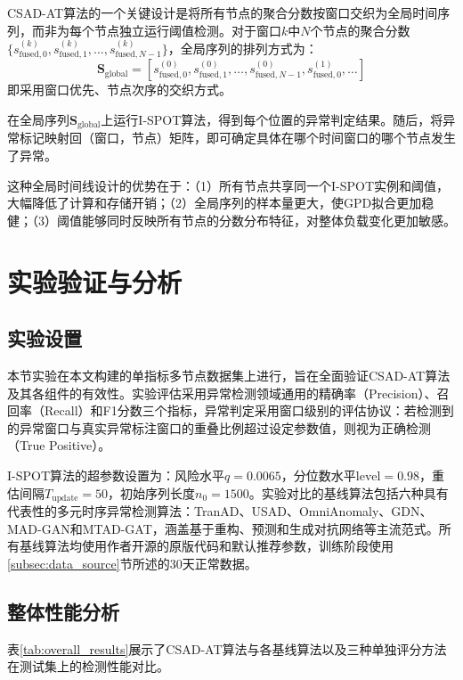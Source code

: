 CSAD-AT算法的一个关键设计是将所有节点的聚合分数按窗口交织为全局时间序列，而非为每个节点独立运行阈值检测。对于窗口$k$中$N$个节点的聚合分数$\{s_{\text{fused},0}^{(k)}, s_{\text{fused},1}^{(k)}, \ldots, s_{\text{fused},N-1}^{(k)}\}$，全局序列的排列方式为：
\begin{equation}
    \mathbf{S}_{\text{global}} = [s_{\text{fused},0}^{(0)}, s_{\text{fused},1}^{(0)}, \ldots, s_{\text{fused},N-1}^{(0)}, s_{\text{fused},0}^{(1)}, \ldots]
\end{equation}
即采用窗口优先、节点次序的交织方式。

在全局序列$\mathbf{S}_{\text{global}}$上运行I-SPOT算法，得到每个位置的异常判定结果。随后，将异常标记映射回（窗口，节点）矩阵，即可确定具体在哪个时间窗口的哪个节点发生了异常。

这种全局时间线设计的优势在于：（1）所有节点共享同一个I-SPOT实例和阈值，大幅降低了计算和存储开销；（2）全局序列的样本量更大，使GPD拟合更加稳健；（3）阈值能够同时反映所有节点的分数分布特征，对整体负载变化更加敏感。

\section{实验验证与分析}\label{sec:experiments}

\subsection{实验设置}

本节实验在本文构建的单指标多节点数据集上进行，旨在全面验证CSAD-AT算法及其各组件的有效性。实验评估采用异常检测领域通用的精确率（Precision）、召回率（Recall）和F1分数三个指标，异常判定采用窗口级别的评估协议：若检测到的异常窗口与真实异常标注窗口的重叠比例超过设定参数值，则视为正确检测（True Positive）。

I-SPOT算法的超参数设置为：风险水平$q = 0.0065$，分位数水平$\text{level} = 0.98$，重估间隔$T_{\text{update}} = 50$，初始序列长度$n_0 = 1500$。实验对比的基线算法包括六种具有代表性的多元时序异常检测算法：TranAD、USAD、OmniAnomaly、GDN、MAD-GAN和MTAD-GAT，涵盖基于重构、预测和生成对抗网络等主流范式。所有基线算法均使用作者开源的原版代码和默认推荐参数，训练阶段使用\ref{subsec:data_source}节所述的30天正常数据。

\subsection{整体性能分析}

表\ref{tab:overall_results}展示了CSAD-AT算法与各基线算法以及三种单独评分方法在测试集上的检测性能对比。

